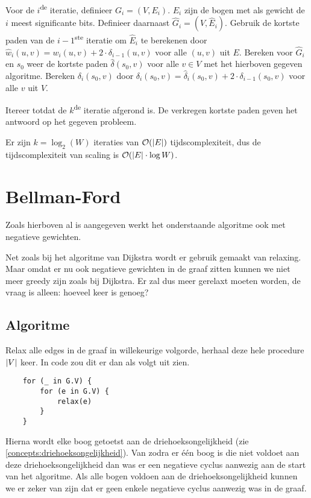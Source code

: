 \documentclass[conference]{IEEEtran}
\theoremstyle{definition}
\theoremstyle{remark}
\DeclarePairedDelimiter{\card}{\vert}{\vert}  %
\begin{document}
Voor de $i$\textsuperscript{de} iteratie, definieer $G_i = (V, E_i)$. $E_i$ zijn de bogen met als gewicht de $i$ meest significante bits. Definieer daarnaast $\hat{G}_i = (V, \hat{E}_i)$. Gebruik de kortste paden van de $i-1$\textsuperscript{ste} iteratie om $\hat{E}_i$ te berekenen door $\hat{w}_i(u, v) = w_i(u, v) + 2 \cdot \delta_{i-1}(u, v)$ voor alle $(u, v)$ uit $E$. Bereken voor $\hat{G}_i$ en $s_0$ weer de kortste paden $\hat{\delta}(s_0, v)$ voor alle $v \in V$ met het hierboven gegeven algoritme. Bereken $\delta_i(s_0, v)$ door $\delta_i(s_0, v) = \hat{\delta}_i(s_0, v) + 2 \cdot \delta_{i-1}(s_0, v)$ voor alle $v$ uit $V$.

Itereer totdat de $k$\textsuperscript{de} iteratie afgerond is. De verkregen kortste paden geven het antwoord op het gegeven probleem.

Er zijn $k = \log_2(W)$ iteraties van $\mathcal{O}(\card{E})$ tijdscomplexiteit, dus de tijdscomplexiteit van scaling is $\mathcal{O}(\card{E} \cdot \log W)$.

\section{Bellman-Ford}
Zoals hierboven al is aangegeven werkt het onderstaande algoritme ook met negatieve gewichten.

Net zoals bij het algoritme van Dijkstra wordt er gebruik gemaakt van relaxing. Maar omdat er nu ook negatieve gewichten in de graaf zitten kunnen we niet meer greedy zijn zoals bij Dijkstra. Er zal dus meer gerelaxt moeten worden, de vraag is alleen: hoeveel keer is genoeg?

\subsection{Algoritme}
Relax alle edges in de graaf in willekeurige volgorde, herhaal deze hele procedure $\card{V}$ keer.
In code zou dit er dan als volgt uit zien.
\begin{verbatim}
    for (_ in G.V) {
        for (e in G.V) {
            relax(e)
        }
    }
\end{verbatim}
Hierna wordt elke boog getoetst aan de driehoeksongelijkheid (zie \ref{concepts:driehoeksongelijkheid}). Van zodra er één boog is die niet voldoet aan deze driehoeksongelijkheid dan was er een negatieve cyclus aanwezig aan de start van het algoritme. Als alle bogen voldoen aan de driehoeksongelijkheid kunnen we er zeker van zijn dat er geen enkele negatieve cyclus aanwezig was in de graaf.
\end{document}
